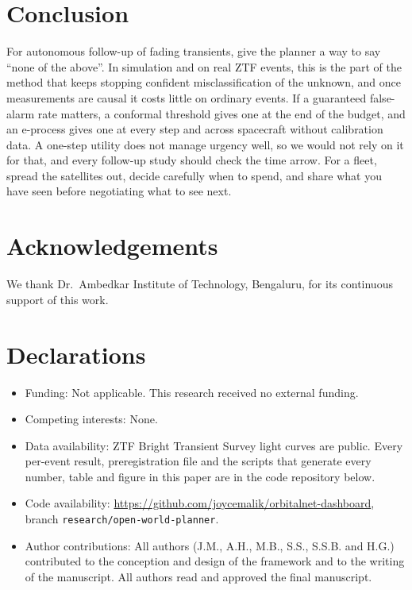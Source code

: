 \documentclass{jaa}
\begin{document}
\section{Conclusion}\label{sec:concl}
For autonomous follow-up of fading transients, give the planner a way to say ``none of the above''. In simulation and on real ZTF events, this is the part of the method that keeps stopping confident misclassification of the unknown, and once measurements are causal it costs little on ordinary events. If a guaranteed false-alarm rate matters, a conformal threshold gives one at the end of the budget, and an e-process gives one at every step and across spacecraft without calibration data. A one-step utility does not manage urgency well, so we would not rely on it for that, and every follow-up study should check the time arrow. For a fleet, spread the satellites out, decide carefully when to spend, and share what you have seen before negotiating what to see next.

\section*{Acknowledgements}
We thank Dr.\ Ambedkar Institute of Technology, Bengaluru, for its continuous support of this work.

\section*{Declarations}

\begin{itemize}
\item Funding: Not applicable. This research received no external funding.
\item Competing interests: None.
\item Data availability: ZTF Bright Transient Survey light curves are public. Every per-event result, preregistration file and the scripts that generate every number, table and figure in this paper are in the code repository below.
\item Code availability: \url{https://github.com/joycemalik/orbitalnet-dashboard}, branch \texttt{research/open-world-planner}.
\item Author contributions: All authors (J.M., A.H., M.B., S.S., S.S.B. and H.G.) contributed to the conception and design of the framework and to the writing of the manuscript. All authors read and approved the final manuscript.
\end{itemize}


\end{document}
